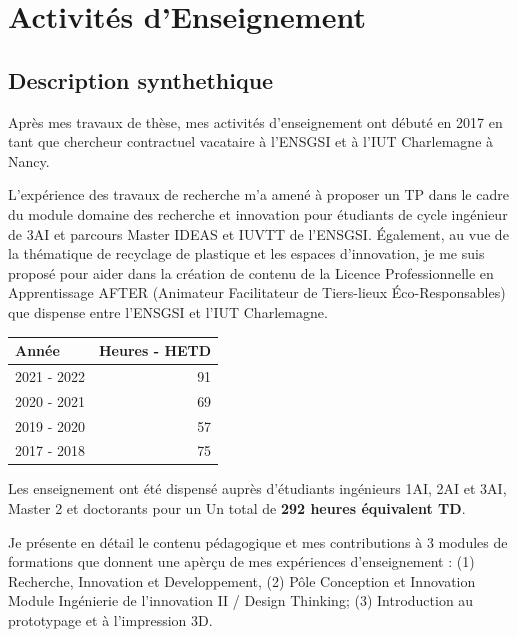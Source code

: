 \documentclass[
  12pt,
  oneside]{book}
\begin{document}
\newpage

\hypertarget{activituxe9s-denseignement}{%
\chapter{Activités d'Enseignement}\label{activituxe9s-denseignement}}

\hypertarget{description-synthethique}{%
\section{Description synthethique}\label{description-synthethique}}

Après mes travaux de thèse, mes activités d'enseignement ont débuté en 2017 en tant que chercheur contractuel vacataire à l'ENSGSI et à l'IUT Charlemagne à Nancy.

L'expérience des travaux de recherche m'a amené à proposer un TP dans le cadre du module domaine des recherche et innovation pour étudiants de cycle ingénieur de 3AI et parcours Master IDEAS et IUVTT de l'ENSGSI.
Également, au vue de la thématique de recyclage de plastique et les espaces d'innovation, je me suis proposé pour aider dans la création de contenu de la Licence Professionnelle en Apprentissage AFTER (Animateur Facilitateur de Tiers-lieux Éco-Responsables) que dispense entre l'ENSGSI et l'IUT Charlemagne.

\begin{table}
\centering
\begin{tabular}[t]{lr}
\toprule
Année & Heures - HETD\\
\midrule
2021 - 2022 & 91\\
2020 - 2021 & 69\\
2019 - 2020 & 57\\
2017 - 2018 & 75\\
\bottomrule
\end{tabular}
\end{table}

Les enseignement ont été dispensé auprès d'étudiants ingénieurs 1AI, 2AI et 3AI, Master 2 et doctorants pour un
Un total de \textbf{292 heures équivalent TD}.

Je présente en détail le contenu pédagogique et mes contributions à 3 modules de formations que donnent une apèrçu de mes expériences d'enseignement : (1) Recherche, Innovation et Developpement, (2) Pôle Conception et Innovation Module Ingénierie de l'innovation II / Design Thinking; (3) Introduction au prototypage et à l'impression 3D.
\end{document}
